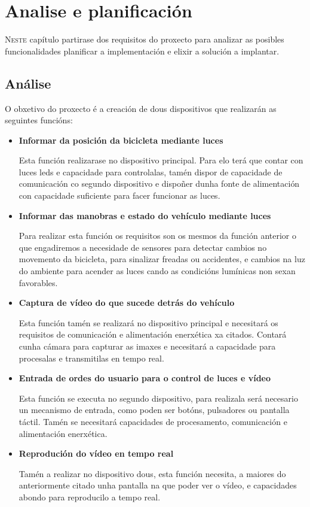 \chapter{Analise e planificación}
\label{chap:Analise e planificación}
\lettrine{N}{este} capítulo partirase dos requisitos do proxecto para analizar as posibles funcionalidades planificar a implementación e elixir a solución a implantar.

\section{Análise}
O obxetivo do proxecto é a creación de dous dispositivos que realizarán as seguintes funcións:
\begin{itemize}
    \item\textbf{Informar da posición da bicicleta mediante luces}

Esta función realizarase no dispositivo principal. Para elo terá que contar con luces leds e capacidade para controlalas, tamén dispor de capacidade de comunicación co segundo dispositivo e dispoñer dunha fonte de alimentación con capacidade suficiente para facer funcionar as luces.\\

    \item\textbf{Informar das manobras e estado do vehículo mediante luces}

Para realizar esta función os requisitos son os mesmos da función anterior o que engadiremos a necesidade de sensores para detectar cambios no movemento da bicicleta, para sinalizar freadas ou accidentes, e cambios na luz do ambiente para acender as luces cando as condicións lumínicas non sexan favorables.\\

    \item\textbf{Captura de vídeo do que sucede detrás do vehículo}

Esta función tamén se realizará no dispositivo principal e necesitará os requisitos de comunicación e alimentación enerxética xa citados. Contará cunha cámara para capturar as imaxes e necesitará a capacidade para procesalas e transmitilas en tempo real.\\

    \item\textbf{Entrada de ordes do usuario para o control de luces e vídeo}

Esta función se executa no segundo dispositivo, para realizala será necesario un mecanismo de entrada, como poden ser botóns, pulsadores ou pantalla táctil. Tamén se necesitará capacidades de procesamento, comunicación e alimentación enerxética.\\

    \item\textbf{Reprodución do vídeo en tempo real}

Tamén a realizar no dispositivo dous, esta función necesita, a maiores do anteriormente citado unha pantalla na que poder ver o vídeo, e capacidades abondo para reproducilo a tempo real.
\end{itemize}

